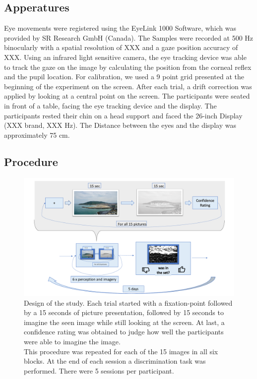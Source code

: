 \documentclass[a4paper,man,natbib,floatsintext]{apa6}
\begin{document}
\subsection{Apperatures} 
Eye movements were registered using the EyeLink 1000 Software, which was provided by SR Research GmbH (Canada). The Samples were recorded at 500 Hz binocularly with a spatial resolution of XXX and a gaze position accuracy of XXX. Using an infrared light sensitive camera, the eye tracking device was able to track the gaze on the image by calculating the position from the corneal reflex and the pupil location. For calibration, we used a 9 point grid presented at the beginning of the experiment on the screen. After each trial, a drift correction was applied by looking at a central point on the screen. The participants were seated in front of a table, facing the eye tracking device and the display. The participants rested their chin on a head support and faced the 26-inch Display (XXX brand, XXX Hz). The Distance between the eyes and the display was approximately 75 cm. \\


\subsection{Procedure} 
\begin{figure}
\centering
\includegraphics[width=1\textwidth]{Procedure.pdf}
\caption[Procedure]{\label{fig:Procedure} Design of the study. Each trial started with a fixation-point followed by a 15 seconds of picture presentation, followed by 15 seconds to imagine the seen image while still looking at the screen. At last, a confidence rating was obtained to judge how well the participants were able to imagine the image. \\ This procedure was repeated for each of the 15 images in all six blocks. At the end of each session a discrimination task was performed. There were 5 sessions per participant. }
\end{figure}
\end{document}
